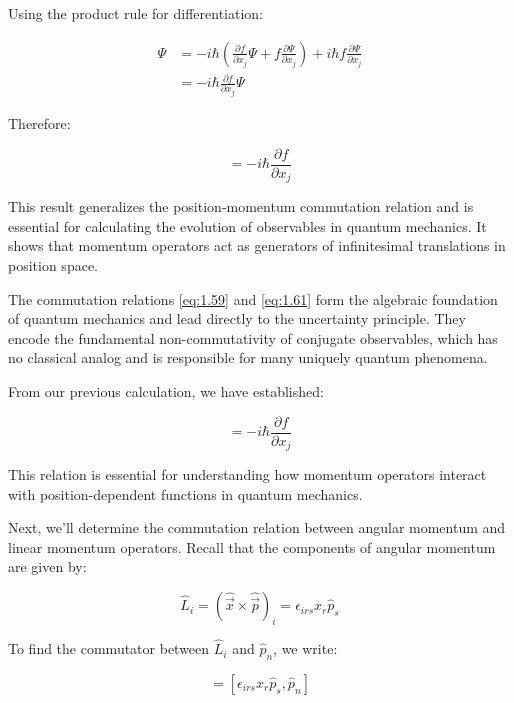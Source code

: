 Using the product rule for differentiation:

\begin{align}
[\hat{p}_j, f]\Psi &= -i\hbar\left(\frac{\partial f}{\partial x_j}\Psi + f\frac{\partial\Psi}{\partial x_j}\right) + i\hbar f\frac{\partial\Psi}{\partial x_j} \label{eq:1.61} \\
&= -i\hbar\frac{\partial f}{\partial x_j}\Psi
\end{align}

Therefore:

\begin{equation}
[\hat{p}_j, f] = -i\hbar\frac{\partial f}{\partial x_j}
\end{equation}

This result generalizes the position-momentum commutation relation and is essential for calculating the evolution of observables in quantum mechanics. It shows that momentum operators act as generators of infinitesimal translations in position space.

The commutation relations \eqref{eq:1.59} and \eqref{eq:1.61} form the algebraic foundation of quantum mechanics and lead directly to the uncertainty principle. They encode the fundamental non-commutativity of conjugate observables, which has no classical analog and is responsible for many uniquely quantum phenomena.


From our previous calculation, we have established:

\begin{equation}
[\hat{p}_j, f] = -i\hbar\frac{\partial f}{\partial x_j}
\end{equation}

This relation is essential for understanding how momentum operators interact with position-dependent functions in quantum mechanics.

Next, we'll determine the commutation relation between angular momentum and linear momentum operators. Recall that the components of angular momentum are given by:

\begin{equation}
\hat{L}_i = (\hat{\vec{x}} \times \hat{\vec{p}})_i = \epsilon_{irs}x_r\hat{p}_s
\end{equation}

To find the commutator between $\hat{L}_i$ and $\hat{p}_n$, we write:

\begin{equation}
[\hat{L}_i, \hat{p}_n] = [\epsilon_{irs}x_r\hat{p}_s, \hat{p}_n]
\end{equation}

